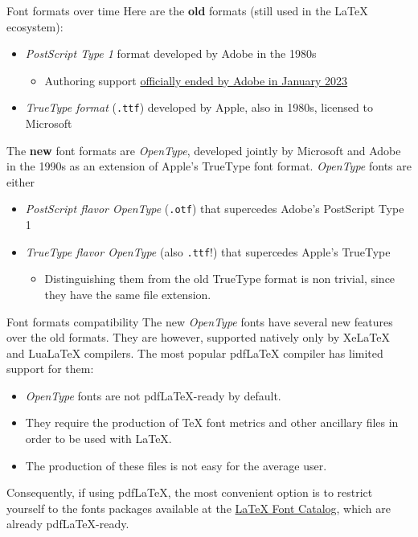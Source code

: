 \documentclass{beamer}
\newcommand{\hrefcol}[2]{\textcolor{uihteal}{\href{#1}{#2}}}
\begin{document}
\begin{frame}[fragile]{Font formats over time}
Here are the \textbf{old} formats (still used in the LaTeX ecosystem):

\begin{itemize}
\item \emph{PostScript Type 1} format developed by Adobe in the 1980s
\begin{itemize}
    \item Authoring support \hrefcol{https://helpx.adobe.com/fonts/kb/postscript-type-1-fonts-end-of-support.html}{officially ended by Adobe in January 2023}
\end{itemize}
\item \emph{TrueType format} (\verb|.ttf|) developed by Apple, also in 1980s, licensed to Microsoft
\end{itemize}

The \textbf{new} font formats are \emph{OpenType}, developed jointly by Microsoft and Adobe in the 1990s as an extension of Apple's TrueType font format. \emph{OpenType} fonts are either

\begin{itemize}
\item \emph{PostScript flavor OpenType} (\verb|.otf|) that supercedes Adobe's PostScript Type 1
\item \emph{TrueType flavor OpenType} (also \verb|.ttf|!) that supercedes Apple's TrueType
    \begin{itemize}
    \item Distinguishing them from the old TrueType format is non trivial, since they have the same file extension.
    \end{itemize}
\end{itemize}
\end{frame}


\begin{frame}[fragile]{Font formats compatibility}
The new \emph{OpenType} fonts have several new features over the old formats. They are however, supported natively only by XeLaTeX and LuaLaTeX compilers. The most popular pdfLaTeX compiler has limited support for them:
\begin{itemize}
\item \emph{OpenType} fonts are not pdfLaTeX-ready by default.
\item They require the production of TeX font metrics and other ancillary files in order to be used with LaTeX.
\item The production of these files is not easy for the average user.
\end{itemize}
Consequently, if using pdfLaTeX, the most convenient option is to restrict yourself to the fonts packages available at the \hrefcol{https://tug.org/FontCatalogue/}{LaTeX Font Catalog}, which are already pdfLaTeX-ready.
\end{frame}
\end{document}
